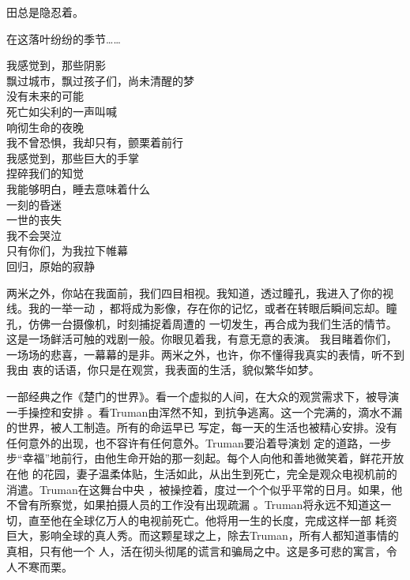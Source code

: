 \documentclass[12pt,a4paper]{article}
\begin{document}
		田总是隐忍着。

		在这落叶纷纷的季节……

	\endwriting



		\longpoem{}{}{}
		我感觉到，那些阴影 \\
		飘过城市，飘过孩子们，尚未清醒的梦 \\
		没有未来的可能 \\
		死亡如尖利的一声叫喊 \\
		响彻生命的夜晚 \\
		我不曾恐惧，我却只有，颤栗着前行 \\
		我感觉到，那些巨大的手掌 \\
		捏碎我们的知觉 \\
		我能够明白，睡去意味着什么 \\
		一刻的昏迷 \\
		一世的丧失 \\
		我不会哭泣 \\
		只有你们，为我拉下帷幕 \\
		回归，原始的寂静
		\endlongpoem

	\endwriting



		两米之外，你站在我面前，我们四目相视。我知道，透过瞳孔，我进入了你的视线。我的一举一动
	，都将成为影像，存在你的记忆，或者在转眼后瞬间忘却。瞳孔，仿佛一台摄像机，时刻捕捉着周遭的
	一切发生，再合成为我们生活的情节。这是一场鲜活可触的戏剧一般。你眼见着我，有意无意的表演。
	我目睹着你们，一场场的悲喜，一幕幕的是非。两米之外，也许，你不懂得我真实的表情，听不到我由
	衷的话语，你只是在观赏，我表面的生活，貌似繁华如梦。

		一部经典之作《楚门的世界》。看一个虚拟的人间，在大众的观赏需求下，被导演一手操控和安排
	。看Truman由浑然不知，到抗争逃离。这一个完满的，滴水不漏的世界，被人工制造。所有的命运早已
	写定，每一天的生活也被精心安排。没有任何意外的出现，也不容许有任何意外。Truman要沿着导演划
	定的道路，一步步“幸福”地前行，由他生命开始的那一刻起。每个人向他和善地微笑着，鲜花开放在他
	的花园，妻子温柔体贴，生活如此，从出生到死亡，完全是观众电视机前的消遣。Truman在这舞台中央
	，被操控着，度过一个个似乎平常的日月。如果，他不曾有所察觉，如果拍摄人员的工作没有出现疏漏
	。Truman将永远不知道这一切，直至他在全球亿万人的电视前死亡。他将用一生的长度，完成这样一部
	耗资巨大，影响全球的真人秀。而这颗星球之上，除去Truman，所有人都知道事情的真相，只有他一个
	人，活在彻头彻尾的谎言和骗局之中。这是多可悲的寓言，令人不寒而栗。
\end{document}
